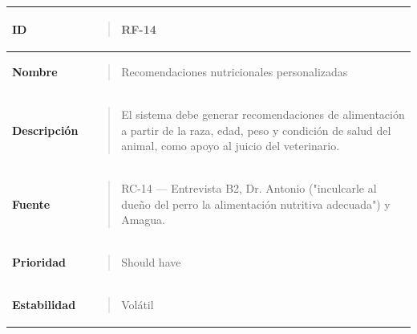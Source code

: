 \documentclass[
]{article}
\newcounter{none} %
\begin{document}
{\def\LTcaptype{none} %
\begin{longtable}[]{@{}
  >{\raggedright\arraybackslash}p{}
  >{\raggedright\arraybackslash}p{}@{}}
\toprule\noalign{}
\begin{minipage}[b]{\linewidth}\raggedright
\textbf{ID}
\end{minipage} & \begin{minipage}[b]{\linewidth}\raggedright
\begin{quote}
RF-14
\end{quote}
\end{minipage} \\
\midrule\noalign{}
\endhead
\bottomrule\noalign{}
\endlastfoot
\textbf{Nombre} & \begin{minipage}[t]{\linewidth}\raggedright
\begin{quote}
Recomendaciones nutricionales personalizadas
\end{quote}
\end{minipage} \\
\textbf{Descripción} & \begin{minipage}[t]{\linewidth}\raggedright
\begin{quote}
El sistema debe generar recomendaciones de alimentación a partir de la
raza, edad, peso y condición de salud del animal, como apoyo al juicio
del veterinario.
\end{quote}
\end{minipage} \\
\textbf{Fuente} & \begin{minipage}[t]{\linewidth}\raggedright
\begin{quote}
RC-14 --- Entrevista B2, Dr. Antonio ("inculcarle al dueño del perro la
alimentación nutritiva adecuada") y Amagua.
\end{quote}
\end{minipage} \\
\textbf{Prioridad} & \begin{minipage}[t]{\linewidth}\raggedright
\begin{quote}
Should have
\end{quote}
\end{minipage} \\
\textbf{Estabilidad} & \begin{minipage}[t]{\linewidth}\raggedright
\begin{quote}
Volátil
\end{quote}
\end{minipage} \\

\end{longtable}}
\end{document}
